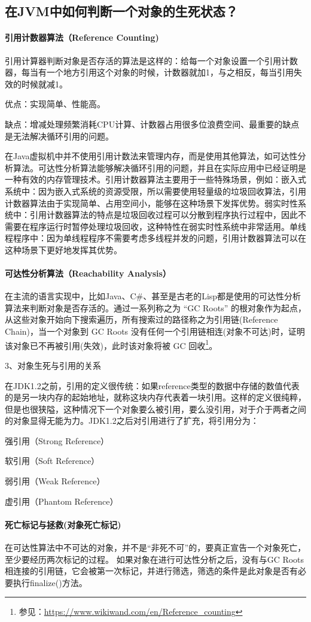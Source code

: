 \documentclass[../../../interview-questions.tex]{subfiles}
\begin{document}
\subsection{在JVM中如何判断一个对象的生死状态？}

\paragraph{引用计数器算法（Reference Counting)}

引用计算器判断对象是否存活的算法是这样的：给每一个对象设置一个引用计数器，每当有一个地方引用这个对象的时候，计数器就加1，与之相反，每当引用失效的时候就减1。

优点：实现简单、性能高。

缺点：增减处理频繁消耗CPU计算、计数器占用很多位浪费空间、最重要的缺点是无法解决循环引用的问题。

在Java虚拟机中并不使用引用计数法来管理内存，而是使用其他算法，如可达性分析算法。可达性分析算法能够解决循环引用的问题，并且在实际应用中已经证明是一种有效的内存管理技术。引用计数器算法主要用于一些特殊场景，例如：嵌入式系统中：因为嵌入式系统的资源受限，所以需要使用轻量级的垃圾回收算法，引用计数器算法由于实现简单、占用空间小，能够在这种场景下发挥优势。弱实时性系统中：引用计数器算法的特点是垃圾回收过程可以分散到程序执行过程中，因此不需要在程序运行时暂停处理垃圾回收，这种特性在弱实时性系统中非常适用。单线程程序中：因为单线程程序不需要考虑多线程并发的问题，引用计数器算法可以在这种场景下更好地发挥其优势。

\paragraph{可达性分析算法（Reachability Analysis）}

在主流的语言实现中，比如Java、C\#、甚至是古老的Lisp都是使用的可达性分析算法来判断对象是否存活的。通过一系列称之为 “GC Roots” 的根对象作为起点，从这些对象开始向下搜索遍历，所有搜索过的路径称之为引用链(Reference Chain)，当一个对象到 GC Roots 没有任何一个引用链相连(对象不可达)时，证明该对象已不再被引用(失效)，此时该对象将被 GC 回收\footnote{参见：\url{https://www.wikiwand.com/en/Reference_counting}}。

3、对象生死与引用的关系

在JDK1.2之前，引用的定义很传统：如果reference类型的数据中存储的数值代表的是另一块内存的起始地址，就称这块内存代表着一块引用。这样的定义很纯粹，但是也很狭隘，这种情况下一个对象要么被引用，要么没引用，对于介于两者之间的对象显得无能为力。JDK1.2之后对引用进行了扩充，将引用分为：

强引用（Strong Reference）

软引用（Soft Reference）

弱引用（Weak Reference）

虚引用（Phantom Reference）

\paragraph{死亡标记与拯救(对象死亡标记)}

在可达性算法中不可达的对象，并不是“非死不可”的，要真正宣告一个对象死亡，至少要经历两次标记的过程。
如果对象在进行可达性分析之后，没有与GC Roots相连接的引用链，它会被第一次标记，并进行筛选，筛选的条件是此对象是否有必要执行finalize()方法。
\end{document}
